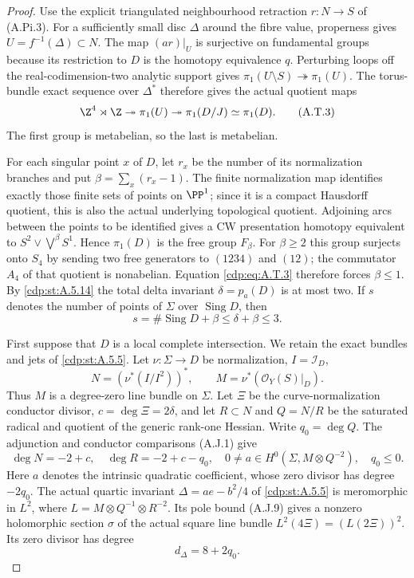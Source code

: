 \begin{proof}
Use the explicit triangulated neighbourhood retraction
$r:N\to S$ of (A.Pi.3). For a sufficiently small disc
$\Delta$ around the fibre value, properness gives
$U=f^{-1}(\Delta)\subset N$. The map $(ar)|_U$ is
surjective on fundamental groups because its restriction
to $D$ is the homotopy equivalence $q$. Perturbing loops
off the real-codimension-two analytic support gives
$\pi_1(U\setminus S)\twoheadrightarrow\pi_1(U)$.
The torus-bundle exact sequence over $\Delta^*$ therefore
gives the actual quotient maps
\[
 \Z^4\rtimes\Z\twoheadrightarrow\pi_1(U)
       \twoheadrightarrow\pi_1(D/J)\simeq\pi_1(D).
                                                        \tag{A.T.3}\label{cdp:eq:A.T.3}
\]
The first group is metabelian, so the last is metabelian.

For each singular point $x$ of $D$, let $r_x$ be the
number of its normalization branches and put
$\beta=\sum_x(r_x-1)$. The finite normalization map
identifies exactly those finite sets of points on
$\PP^1$; since it is a compact Hausdorff quotient,
this is also the actual underlying topological quotient.
Adjoining arcs between the points to be identified
gives a CW presentation homotopy equivalent to
$S^2\vee\bigvee^\beta S^1$. Hence
$\pi_1(D)$ is the free group $F_\beta$.
For $\beta\ge2$ this group surjects onto $S_4$ by
sending two free generators to $(1234)$ and $(12)$;
the commutator $A_4$ of that quotient is nonabelian.
Equation \eqref{cdp:eq:A.T.3} therefore forces $\beta\le1$.
By \ref{cdp:st:A.5.14} the total delta invariant $\delta=p_a(D)$
is at most two. If $s$ denotes the number of points
of $\Sigma$ over $\operatorname{Sing}D$, then
\[
 s=\#\operatorname{Sing}D+\beta\le\delta+\beta\le3.
                                                        \tag{A.T.4}\label{cdp:eq:A.T.4}
\]

First suppose that $D$ is a local complete intersection.
We retain the exact bundles and jets of \ref{cdp:st:A.5.5}.
Let $\nu:\Sigma\to D$ be normalization, $I=\mathcal I_D$,
\[
 N=(\nu^*(I/I^2))^*,\qquad
 M=\nu^*(\mathcal O_Y(S)|_D).
\]
Thus $M$ is a degree-zero line bundle on $\Sigma$.
Let $\Xi$ be the curve-normalization
conductor divisor, $c=\deg\Xi=2\delta$, and let
$R\subset N$ and $Q=N/R$ be the saturated radical and
quotient of the generic rank-one Hessian. Write
$q_0=\deg Q$. The adjunction and conductor comparisons
(A.J.1) give
\[
 \deg N=-2+c,\quad \deg R=-2+c-q_0,\quad
 0\ne a\in H^0(\Sigma,M\otimes Q^{-2}),\quad q_0\le0.
                                                        \tag{A.T.5}\label{cdp:eq:A.T.5}
\]
Here $a$ denotes the intrinsic quadratic coefficient,
whose zero divisor has degree $-2q_0$.
The actual quartic invariant $\Delta=ae-b^2/4$ of
\ref{cdp:st:A.5.5} is meromorphic in
$L^2$, where $L=M\otimes Q^{-1}\otimes R^{-2}$.
Its pole bound (A.J.9) gives a nonzero holomorphic
section $\sigma$ of the actual square line bundle
$L^2(4\Xi)=(L(2\Xi))^2$. Its zero divisor has degree
\[
               d_\Delta=8+2q_0.                    \tag{A.T.6}\label{cdp:eq:A.T.6}
\]


\end{proof}
